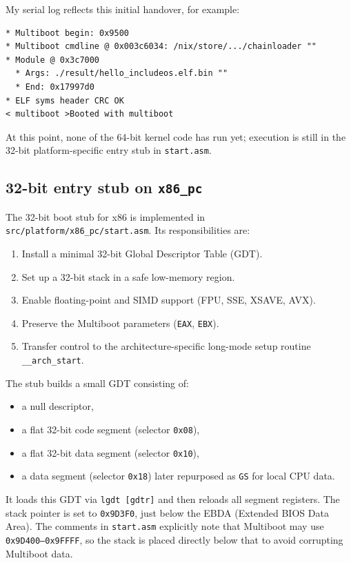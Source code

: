 \documentclass[a4paper,11pt]{article}
\begin{document}
My serial log reflects this initial handover, for example:

\begin{verbatim}
* Multiboot begin: 0x9500
* Multiboot cmdline @ 0x003c6034: /nix/store/.../chainloader ""
* Module @ 0x3c7000
  * Args: ./result/hello_includeos.elf.bin ""
  * End: 0x17997d0
* ELF syms header CRC OK
< multiboot >Booted with multiboot
\end{verbatim}

At this point, none of the 64-bit kernel code has run yet; execution is
still in the 32-bit platform-specific entry stub in
\texttt{start.asm}.

\subsection{32-bit entry stub on \texorpdfstring{\texttt{x86\_pc}}{x86\_pc}}

The 32-bit boot stub for x86 is implemented in
\texttt{src/platform/x86\_pc/start.asm}. Its responsibilities are:

\begin{enumerate}
  \item Install a minimal 32-bit Global Descriptor Table (GDT).
  \item Set up a 32-bit stack in a safe low-memory region.
  \item Enable floating-point and SIMD support (FPU, SSE, XSAVE, AVX).
  \item Preserve the Multiboot parameters (\texttt{EAX}, \texttt{EBX}).
  \item Transfer control to the architecture-specific long-mode setup
        routine \texttt{\_\_arch\_start}.
\end{enumerate}

The stub builds a small GDT consisting of:

\begin{itemize}
  \item a null descriptor,
  \item a flat 32-bit code segment (selector \texttt{0x08}),
  \item a flat 32-bit data segment (selector \texttt{0x10}),
  \item a data segment (selector \texttt{0x18}) later repurposed as
        \texttt{GS} for local CPU data.
\end{itemize}

It loads this GDT via \texttt{lgdt [gdtr]} and then reloads all segment
registers. The stack pointer is set to \texttt{0x9D3F0}, just below the
EBDA (Extended BIOS Data Area). The comments in \texttt{start.asm}
explicitly note that Multiboot may use \texttt{0x9D400--0x9FFFF}, so the
stack is placed directly below that to avoid corrupting Multiboot data.
\end{document}
